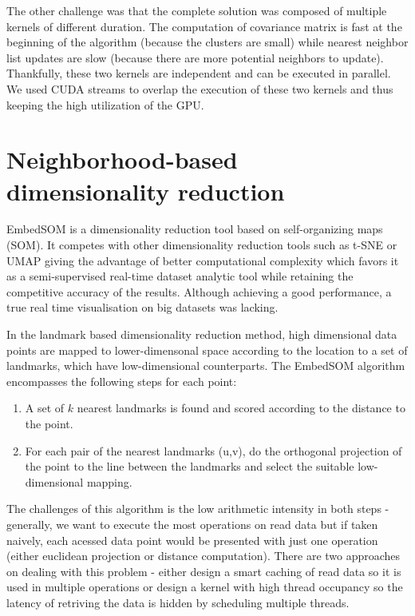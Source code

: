 The other challenge was that the complete solution was composed of multiple kernels of different duration. The computation of covariance matrix is fast at the beginning of the algorithm (because the clusters are small) while nearest neighbor list updates are slow (because there are more potential neighbors to update). Thankfully, these two kernels are independent and can be executed in parallel. We used CUDA streams to overlap the execution of these two kernels and thus keeping the high utilization of the GPU.

\section{Neighborhood-based dimensionality reduction}

EmbedSOM is a dimensionality reduction tool based on self-organizing maps (SOM). It competes with other dimensionality reduction tools such as t-SNE or UMAP giving the advantage of better computational complexity which favors it as a semi-supervised real-time dataset analytic tool while retaining the competitive accuracy of the results.
Although achieving a good performance, a true real time visualisation on big datasets was lacking. 

In the landmark based dimensionality reduction method, high dimensional data points are mapped to lower-dimensonal space according to the location to a set of landmarks, which have low-dimensional counterparts.
The EmbedSOM algorithm encompasses the following steps for each point:
\begin{enumerate}
    \item A set of $k$ nearest landmarks is found and scored according to the distance to the point.
    \item For each pair of the nearest landmarks (u,v), do the orthogonal projection of the point to the line between the landmarks and select the suitable low-dimensional mapping.
\end{enumerate}

The challenges of this algorithm is the low arithmetic intensity in both steps - generally, we want to execute the most operations on read data but if taken naively, each acessed data point would be presented with just one operation (either euclidean projection or distance computation).
There are two approaches on dealing with this problem - either design a smart caching of read data so it is used in multiple operations or design a kernel with high thread occupancy so the latency of retriving the data is hidden by scheduling multiple threads.

